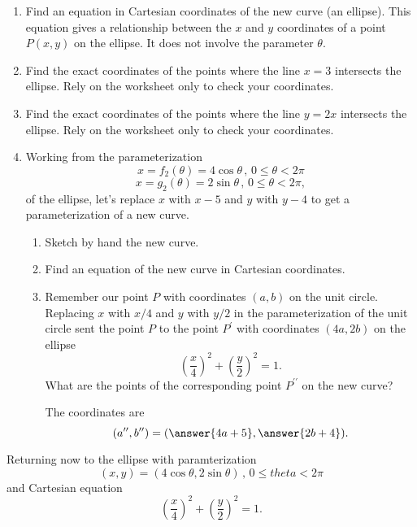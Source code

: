 \documentclass{ximera}
\begin{document}
\begin{example}
\begin{enumerate}
\item Find an equation in Cartesian coordinates of the new curve (an ellipse). This equation gives a relationship between the $x$ and $y$ coordinates of a point $P(x,y)$ on the ellipse. It does not involve the parameter $\theta$.

\item Find the exact coordinates of the points where the line $x=3$ intersects the ellipse. Rely on the worksheet only to check your coordinates.

\item Find the exact coordinates of the points where the line $y=2x$ intersects the ellipse. Rely on the worksheet only to check your coordinates.

\item Working from the parameterization 
\[
     x = f_2 (\theta) = 4\cos\theta \, , \, 0\leq \theta <2\pi
\]
\[
   x = g_2 (\theta) = 2\sin\theta \, , \, 0\leq \theta <2\pi ,
\]
of the ellipse, let's replace $x$ with $x-5$ and $y$ with $y-4$ to get a parameterization of a new curve.

\begin{enumerate}
\item Sketch by hand the new curve.

\item Find an equation of the new curve in Cartesian coordinates.

\item Remember our point $P$ with coordinates $(a,b)$ on the unit circle. Replacing $x$ with $x/4$ and $y$ with $y/2$ in the parameterization of the unit circle sent the point $P$ to the point $P^\prime$ with coordinates $(4a, 2b)$ on the ellipse
\[
  \left( \frac{x}{4} \right)^2 + \left( \frac{y}{2} \right)^2 = 1.
\]
What are the points of the corresponding point $P^{\prime\prime}$ on the new curve?

The coordinates are 
\[
   (a^{\prime\prime} , b^{\prime\prime}) = (\answer{4a+5} , \answer{2b+4} ) .
\]


\end{enumerate}

\end{enumerate}
\end{example}

\begin{example}
Returning now to the ellipse with paramterization
\[
      (x,y) = (4\cos \theta , 2\sin\theta) \, , \, 0\leq theta <2\pi
\]
and Cartesian equation
\[
     \left( \frac{x}{4} \right)^2 + \left( \frac{y}{2} \right)^2 = 1.
\]
\end{example}
\end{document}
